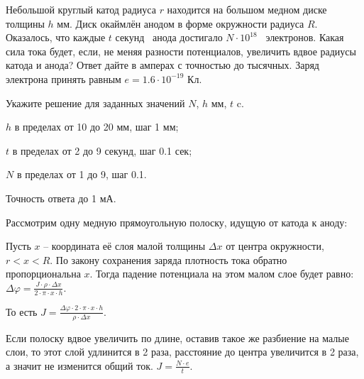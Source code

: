 
Небольшой круглый катод радиуса $r$ находится на большом медном диске толщины $h$ мм. Диск окаймлён анодом в форме окружности радиуса
$R$. Оказалось, что каждые $t$ секунд  анода достигало $N \cdot 10^{18}$  электронов. Какая сила тока будет, если, не
меняя разности потенциалов, увеличить вдвое радиусы катода и анода? Ответ дайте в амперах с точностью до тысячных. Заряд электрона
принять равным \linebreak $e = 1.6 \cdot 10^{-19}$ Кл.

Укажите решение для заданных значений $N$, $h$ мм, $t$ c.

\paramSection

$h$ в пределах от 10 до 20 мм, шаг  1 мм;   

$t$ в пределах от 2 до 9 секунд, шаг 0.1 сек;

$N$ в пределах от 1 до 9, шаг 0.1.

Точность ответа  до  1 мА.

\solutionSection

Рассмотрим одну медную прямоугольную полоску, идущую от катода к аноду:


Пусть $x$ –  координата её слоя малой толщины $\Delta x$ от центра окружности, \linebreak $r<x<R$. По закону 
сохранения заряда плотность тока обратно пропорциональна $x$. Тогда падение потенциала на этом малом 
слое будет равно: $\Delta \varphi=\frac{J \cdot \rho  \cdot \Delta x}{2 \cdot \pi \cdot x \cdot h}$.  

То есть $J=\frac{\Delta \varphi \cdot 2 \cdot \pi \cdot x \cdot h}{\rho  \cdot \Delta x}$.

Если полоску вдвое увеличить по длине, оставив такое же разбиение на малые слои, то этот слой удлинится 
в 2 раза, расстояние до центра увеличится в 2 раза, а значит не изменится общий ток. $J = \frac{N \cdot e}{t}$.

